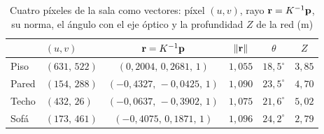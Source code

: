 \begin{table}[htbp]
\caption{Cuatro píxeles de la sala como vectores: píxel $(u,v)$, rayo $\mathbf{r}=K^{-1}\mathbf{p}$, su norma, el ángulo con el eje óptico y la profundidad $Z$ de la red (m)}
\label{tab:hab-rayos}
\centering\small
\begin{tabular}{@{}llcccc@{}}
\toprule
 & $(u,v)$ & $\mathbf{r}=K^{-1}\mathbf{p}$ & $\lVert\mathbf{r}\rVert$ & $\theta$ & $Z$ \\
\midrule
Piso & $(631,\,522)$ & $(0{,}2004,\,0{,}2681,\,1)$ & $1{,}055$ & $18{,}5^\circ$ & $3{,}85$ \\
Pared & $(154,\,288)$ & $(-0{,}4327,\,-0{,}0425,\,1)$ & $1{,}090$ & $23{,}5^\circ$ & $4{,}70$ \\
Techo & $(432,\,26)$ & $(-0{,}0637,\,-0{,}3902,\,1)$ & $1{,}075$ & $21{,}6^\circ$ & $5{,}02$ \\
Sofá & $(173,\,461)$ & $(-0{,}4075,\,0{,}1871,\,1)$ & $1{,}096$ & $24{,}2^\circ$ & $2{,}79$ \\
\bottomrule
\end{tabular}
\end{table}
